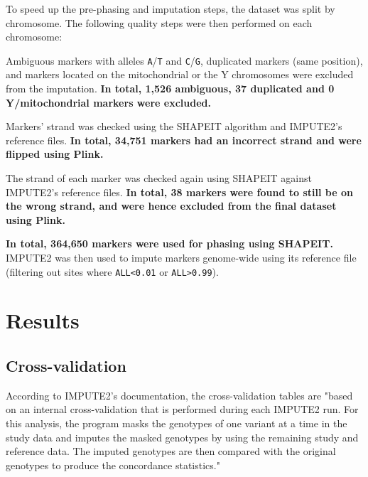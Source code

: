 \documentclass[10pt,twoside,english]{scrartcl}
\let\ttempone\enumerate
\let\ttemptwo\endenumerate
\renewenvironment{enumerate}{\ttempone\setlength{\itemsep}{0pt}}{\ttemptwo}
\begin{document}
To speed up the pre-phasing and imputation steps, the dataset was split by
chromosome. The following quality steps were then performed on each chromosome:


\begin{enumerate}

\item Ambiguous markers with alleles \texttt{A}/\texttt{T} and
\texttt{C}/\texttt{G}, duplicated markers (same position), and markers
located on the mitochondrial or the Y chromosomes were excluded from
the imputation. \textbf{In total, 1,526 ambiguous, 37 duplicated and 0
Y/mitochondrial markers were excluded.}


\item Markers' strand was checked using the SHAPEIT algorithm and IMPUTE2's
reference files. \textbf{In total, 34,751 markers had an incorrect
strand and were flipped using Plink.}


\item The strand of each marker was checked again using SHAPEIT against
IMPUTE2's reference files. \textbf{In total, 38 markers were found to
still be on the wrong strand, and were hence excluded from the final
dataset using Plink.}

\end{enumerate}



\textbf{In total, 364,650 markers were used for phasing
using SHAPEIT.} IMPUTE2 was then used to impute markers genome-wide using its
reference file (filtering out sites where \texttt{ALL<0.01} or \texttt{ALL>0.99}).

\section{Results}\label{sec:results}


\subsection{Cross-validation}\label{subsec:cross_validation}


According to IMPUTE2's documentation, the cross-validation tables are "based on
an internal cross-validation that is performed during each IMPUTE2 run. For
this analysis, the program masks the genotypes of one variant at a time in the
study data and imputes the masked genotypes by using the remaining study and
reference data. The imputed genotypes are then compared with the original
genotypes to produce the concordance statistics."\\
\end{document}
